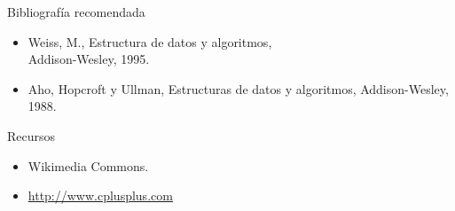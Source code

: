 \documentclass{beamer} %
\begin{document}
\begin{frame}
 \begin{block}{Bibliografía recomendada}
  \begin{itemize}
    \item Weiss, M., Estructura de datos y algoritmos,\\ Addison-Wesley, 1995.
    \item Aho, Hopcroft y Ullman, Estructuras de datos y algoritmos, Addison-Wesley, 1988.
  \end{itemize}
 \end{block}
 \begin{block}{Recursos}
  \begin{itemize}
    \item Wikimedia Commons.
    \item \url{http://www.cplusplus.com}
  \end{itemize}
 \end{block}
\end{frame}
\end{document}
